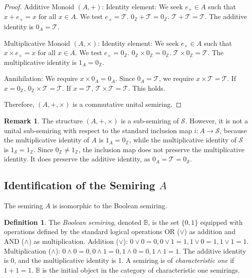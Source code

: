 \documentclass[11pt, a4paper]{article}
\theoremstyle{plain}
\theoremstyle{definition}
\newtheorem{definition}[theorem]{Definition}
\newtheorem{remark}[theorem]{Remark}
\numberwithin{equation}{section}
\newcommand{\Z}{\mathbb{Z}}
\newcommand{\Tobj}{\mathcal{T}} %
\newcommand{\SemiringS}{\mathcal{S}}
\newcommand{\Bool}{\mathbb{B}}
\begin{document}
\begin{proof}
Additive Monoid $(A, +)$:
Identity element: We seek $e_+ \in A$ such that $x+e_+ = x$ for all $x \in A$.
We test $e_+=\Tobj$. $0_{\Z}+\Tobj=0_{\Z}$. $\Tobj+\Tobj=\Tobj$.
The additive identity is $0_A = \Tobj$.

Multiplicative Monoid $(A, \times)$:
Identity element: We seek $e_{\times} \in A$ such that $x\times e_{\times} = x$ for all $x \in A$.
We test $e_{\times}=0_{\Z}$. $0_{\Z}\times 0_{\Z}=0_{\Z}$. $\Tobj\times 0_{\Z}=\Tobj$.
The multiplicative identity is $1_A = 0_{\Z}$.

Annihilation: We require $x\times 0_A = 0_A$. Since $0_A=\Tobj$, we require $x\times\Tobj = \Tobj$.
If $x=0_{\Z}$, $0_{\Z}\times\Tobj=\Tobj$.
If $x=\Tobj$, $\Tobj\times\Tobj=\Tobj$.
This holds.

Therefore, $(A, +, \times)$ is a commutative unital semiring.
\end{proof}

\begin{remark}
The structure $(A, +, \times)$ is a sub-semiring of $\SemiringS$. However, it is not a unital sub-semiring with respect to the standard inclusion map $i: A \to \SemiringS$, because the multiplicative identity of $A$ is $1_A = 0_{\Z}$, while the multiplicative identity of $\SemiringS$ is $1_{\SemiringS} = 1_{\Z}$. Since $0_{\Z} \neq 1_{\Z}$, the inclusion map does not preserve the multiplicative identity. It does preserve the additive identity, as $0_A=\Tobj=0_{\SemiringS}$.
\end{remark}

\subsection{Identification of the Semiring \texorpdfstring{$A$}{A}}

The semiring $A$ is isomorphic to the Boolean semiring.

\begin{definition}\label{def:boolean_semiring}
The \emph{Boolean semiring}, denoted $\Bool$, is the set $\{0, 1\}$ equipped with operations defined by the standard logical operations OR ($\lor$) as addition and AND ($\wedge$) as multiplication.
Addition ($\lor$): $0\lor 0=0, 0\lor 1=1, 1\lor 0=1, 1\lor 1=1$.
Multiplication ($\wedge$): $0\wedge 0=0, 0\wedge 1=0, 1\wedge 0=0, 1\wedge 1=1$.
The additive identity is 0, and the multiplicative identity is 1. A semiring is of \emph{characteristic one} if $1+1=1$. $\Bool$ is the initial object in the category of characteristic one semirings.
\end{definition}
\end{document}

